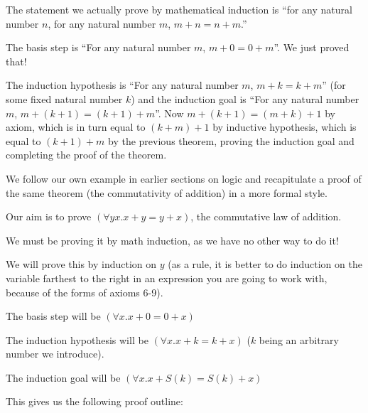 \documentclass[12pt]{book}
\begin{document}
\begin{description}
The statement we actually prove by mathematical induction is ``for any
natural number $n$, for any natural number $m$, $m+n=n+m$.''

The basis step is ``For any natural number $m$, $m+0 = 0+m$''.  We
just proved that!

The induction hypothesis is ``For any natural number $m$, $m+k =
k+m$'' (for some fixed natural number $k$) and the induction goal is
``For any natural number $m$, $m+(k+1) = (k+1)+m$''.  Now $m+(k+1) =
(m+k)+1$ by axiom, which is in turn equal to $(k+m)+1$ by inductive
hypothesis, which is equal to $(k+1)+m$ by the previous theorem,
proving the induction goal and completing the proof of the theorem.

\end{description}

We follow our own example in earlier sections on logic and recapitulate a proof of the same theorem (the commutativity of addition) in a more formal style.

Our aim is to prove $(\forall yx.x+y=y+x)$, the commutative law of addition.

We must be proving it by math induction, as we have no other way to do it!

We will prove this by induction on $y$ (as a rule, it is better to do induction on the variable farthest to the right
in an expression you are going to work with, because of the forms of axioms 6-9).

The basis step will be $(\forall x.x+0=0+x)$

The induction hypothesis will be $(\forall x.x+k=k+x)$ ($k$ being an arbitrary number we introduce).

The induction goal will be $(\forall x.x+S(k)=S(k)+x)$

This gives us the following proof outline:
\end{document}
